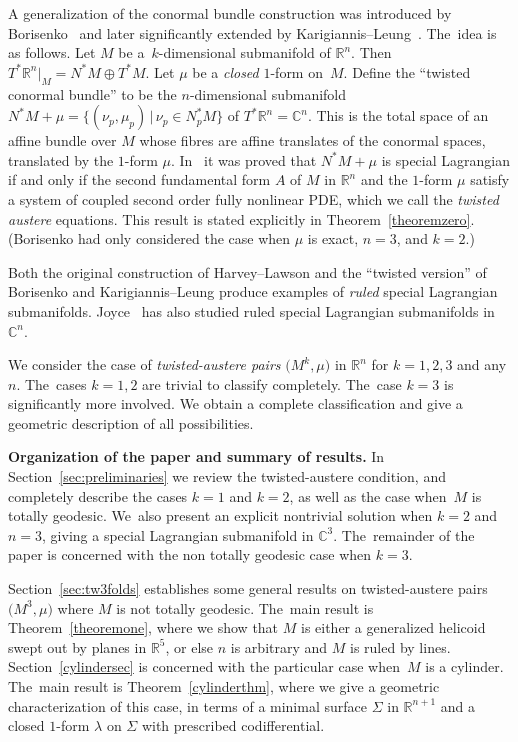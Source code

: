 \documentclass[10pt,a4paper]{amsart}
\def\R{\mathbb{R}}
\def\C{\mathbb{C}}
\numberwithin{equation}{section}
\begin{document}
A generalization of the conormal bundle construction was introduced by Borisenko~\cite{Bo} and later significantly extended by Karigiannis--Leung~\cite{KL}. The~idea is as follows. Let $M$ be a~$k$-dimen\-sional submanifold of $\R^n$. Then $T^* \R^n |_M = N^* M \oplus T^* M$. Let $\mu$ be a \emph{closed} $1$-form on~$M$. Define the ``twisted conormal bundle'' to be the $n$-dimensional submanifold $N^* M + \mu = \{ (\nu_p, \mu_p) \,|\, \nu_p \in N^*_p M \}$ of $T^* \R^n = \C^n$. This is the total space of an affine bundle over $M$ whose fibres are affine translates of the conormal spaces, translated by the $1$-form $\mu$. In~\cite{KL} it was proved that $N^* M+\mu$ is special Lagrangian if and only if the second fundamental form $A$ of $M$ in $\R^n$ and the $1$-form $\mu$ satisfy a system of coupled second order fully nonlinear PDE, which we call the \emph{twisted austere} equations. This result is stated explicitly in Theorem~\ref{theoremzero}. (Borisenko had only considered the case when $\mu$ is exact, $n=3$, and $k=2$.)

Both the original construction of Harvey--Lawson and the ``twisted version'' of Borisenko and Karigiannis--Leung produce examples of \emph{ruled} special Lagrangian submanifolds. Joyce~\cite{J-ruled} has also studied ruled special Lagrangian submanifolds in $\C^n$.

We consider the case of \emph{twisted-austere pairs} $\big(M^k, \mu\big)$ in $\R^n$ for $k=1,2,3$ and any $n$. The~cases $k=1,2$ are trivial to classify completely. The~case $k=3$ is significantly more involved. We obtain a complete classification and give a geometric description of all possibilities.

\textbf{Organization of the paper and summary of results.} In Section~\ref{sec:preliminaries} we review the twisted-austere condition, and completely describe the cases $k=1$ and $k=2$, as well as the case when~$M$ is totally geodesic. We~also present an explicit nontrivial solution when $k=2$ and $n=3$, giving a special Lagrangian submanifold in $\C^3$. The~remainder of the paper is concerned with the non totally geodesic case when $k=3$.

Section~\ref{sec:tw3folds} establishes some general results on twisted-austere pairs $\big(M^3, \mu\big)$ where $M$ is not totally geodesic. The~main result is Theorem~\ref{theoremone}, where we show that $M$ is either a generalized helicoid swept out by planes in $\R^5$, or else $n$ is arbitrary and $M$ is ruled by lines. Section~\ref{cylindersec} is concerned with the particular case when~$M$ is a cylinder. The~main result is Theorem~\ref{cylinderthm}, where we give a geometric characterization of this case, in terms of a minimal surface $\Sigma$ in $\R^{n+1}$ and a closed $1$-form $\lambda$ on $\Sigma$ with prescribed codifferential.
\end{document}
